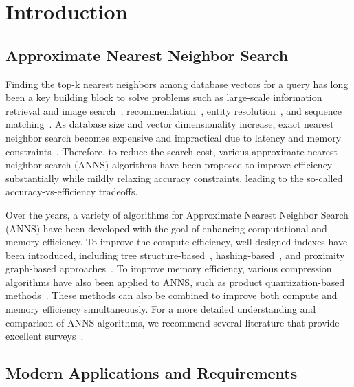 \section{Introduction}\label{sec:intro}

\subsection{Approximate Nearest Neighbor Search}

Finding the top-k nearest neighbors among database vectors for a query has long been a key building block to solve problems such as large-scale information retrieval and image search~\cite{lv2004image, philbin2007object, kulis2009kernelized}, recommendation~\cite{das2007google}, entity resolution~\cite{hoffart2012kore}, and sequence matching~\cite{berlin2015assembling}. As database size and vector dimensionality increase, exact nearest neighbor search becomes expensive and impractical due to latency and memory constraints~\cite{weber1998quantitative, beyer1999nearest, bohm2001searching}. Therefore, to reduce the search cost, various approximate nearest neighbor search (ANNS) algorithms have been proposed to improve efficiency substantially while mildly relaxing accuracy constraints, leading to the so-called accuracy-vs-efficiency tradeoffs. 

Over the years, a variety of algorithms for Approximate Nearest Neighbor Search (ANNS) have been developed with the goal of enhancing computational and memory efficiency. To improve the compute efficiency, well-designed indexes have been introduced, including tree structure-based~\cite{kd-tree,r-star-tree,flann}, hashing-based~\cite{lsh}, and proximity graph-based approaches~\cite{hnsw, nsg}. To improve memory efficiency, various compression algorithms have also been applied to ANNS, such as product quantization-based methods~\cite{product-quantization, opq, cartesian-kmeans, inverted-multi-index, lopq}. These methods can also be combined to improve both compute and memory efficiency simultaneously. For a more detailed understanding and comparison of ANNS algorithms, we recommend several literature that provide excellent surveys~\cite{ann-survey,li2020approximate,wang2021comprehensive}.  

\subsection{Modern Applications and Requirements}

